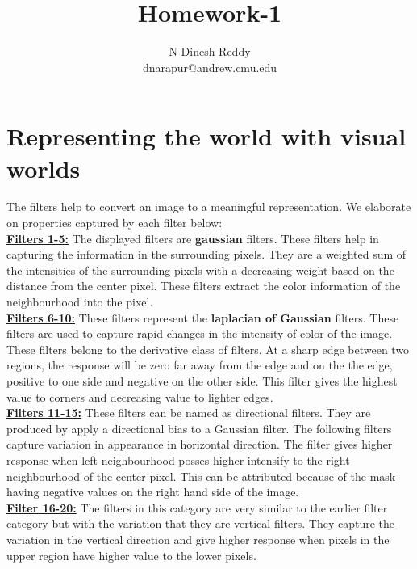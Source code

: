 \documentclass[12pt]{article}
\newenvironment{problem}[2][Problem]{\begin{trivlist}
\item[\hskip \labelsep {\bfseries #1}\hskip \labelsep {\bfseries #2.}]}{\end{trivlist}}
\begin{document}
 
 
\title{Homework-1}
\author{N Dinesh Reddy \\ dnarapur@andrew.cmu.edu }


\maketitle
\section{Representing the world with visual worlds}
\begin{problem}{1.0}
The filters help to convert an image to a meaningful representation. We elaborate on properties captured by each filter below:\\
\underline{\textbf{Filters 1-5:}} The displayed filters are \textbf{gaussian} filters. These filters help in capturing the information in the surrounding pixels. They are a weighted sum of the intensities of the surrounding pixels with a decreasing weight based on the distance from the center pixel. These filters extract the color information of the neighbourhood into the pixel.\\
\underline{\textbf{Filters 6-10:}} These filters represent the \textbf{laplacian of Gaussian} filters. These filters are used to capture rapid changes in the intensity of color of the image. These filters belong to the derivative class of filters. At a sharp edge between two regions, the response will be zero far away from the edge and on the the edge, positive to one side and negative on the other side. This filter gives the highest value to corners and decreasing value to lighter edges.\\
\underline{\textbf{Filters 11-15:}} These filters can be named as directional filters. They are produced by apply a directional bias to a Gaussian filter. The following filters capture variation in appearance in horizontal direction. The filter gives higher response when left neighbourhood posses higher intensify to the right neighbourhood of the center pixel. This can be attributed because of the mask having negative values on the right hand side of the image.\\
\underline{\textbf{Filter 16-20:}} The filters in this category are very similar to the earlier filter category but with the variation that they are vertical filters. They capture the variation in the vertical direction and give higher response when pixels in the upper region have higher value to the lower pixels. 

\end{problem}
\end{document}
